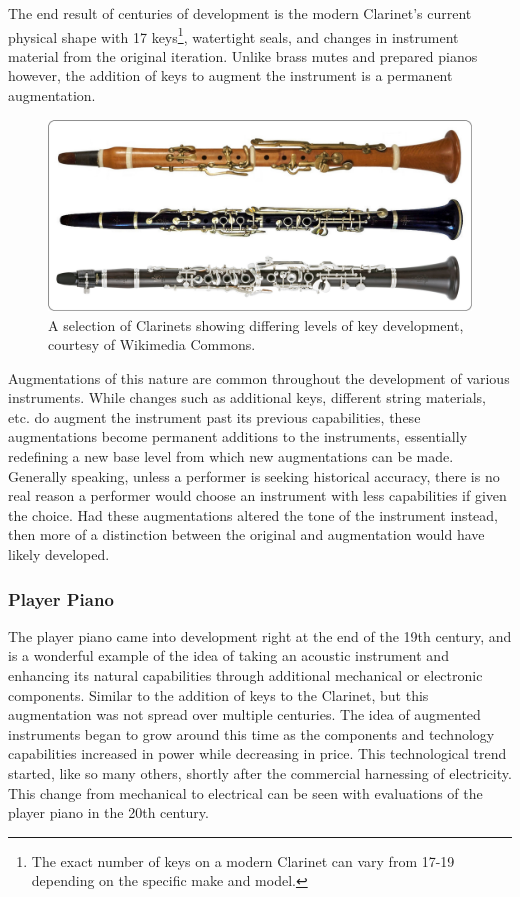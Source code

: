 The end result of centuries of development is the modern Clarinet's current physical shape with 17 keys\footnote{The exact number of keys on a modern Clarinet can vary from 17-19 depending on the specific make and model.}, watertight seals, and changes in instrument material from the original iteration. Unlike brass mutes and prepared pianos however, the addition of keys to augment the instrument is a permanent augmentation. 

\begin{figure}
    \centering
    \includegraphics[scale=0.07]{diagrams/M-A-O-Clarinets.jpg}
    \caption{A selection of Clarinets showing differing levels of key development, courtesy of Wikimedia Commons.}
    \label{fig:clKeys} %
\end{figure}

Augmentations of this nature are common throughout the development of various instruments. While changes such as additional keys, different string materials, etc. do augment the instrument past its previous capabilities, these augmentations become permanent additions to the instruments, essentially redefining a new base level from which new augmentations can be made. Generally speaking, unless a performer is seeking historical accuracy, there is no real reason a performer would choose an instrument with less capabilities if given the choice. Had these augmentations altered the tone of the instrument instead, then more of a distinction between the original and augmentation would have likely developed.

\subsubsection{Player Piano}

The player piano came into development right at the end of the 19th century, and is a wonderful example of the idea of taking an acoustic instrument and enhancing its natural capabilities through additional mechanical or electronic components. Similar to the addition of keys to the Clarinet, but this augmentation was not spread over multiple centuries\cite{clHist}. The idea of augmented instruments began to grow around this time as the components and technology capabilities increased in power while decreasing in price. This technological trend started, like so many others, shortly after the commercial harnessing of electricity. This change from mechanical to electrical can be seen with evaluations of the player piano in the 20th century.

